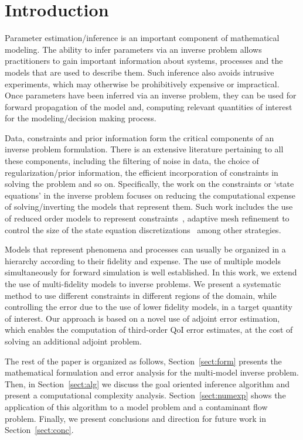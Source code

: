 \section{Introduction}

Parameter estimation/inference is an important component of mathematical modeling. The ability to infer parameters via an inverse problem allows practitioners to gain important information about systems, processes and the models that are used to describe them. Such inference also avoids intrusive experiments, which may otherwise be prohibitively expensive or impractical. Once parameters have been inferred via an inverse problem, they can be used for forward propagation of the model and, computing relevant quantities of interest for the modeling/decision making process.

Data, constraints and prior information form the critical components of an inverse problem formulation. There is an extensive literature pertaining to all these components, including the filtering of noise in data, the choice of regularization/prior information, the efficient incorporation of constraints in solving the problem and so on. Specifically, the work on the constraints or `state equations' in the inverse problem focuses on reducing the computational expense of solving/inverting the models that represent them. Such work includes the use of reduced order models to represent constraints~\cite{}, adaptive mesh refinement to control the size of the state equation discretizations~\cite{} among other strategies.

Models that represent phenomena and processes can usually be organized in a hierarchy according to their fidelity and expense. The use of multiple models simultaneously for forward simulation is well established. In this work, we extend the use of multi-fidelity models to inverse problems. We present a systematic method to use different constraints in different regions of the domain, while controlling the error due to the use of lower fidelity models, in a target quantity of interest. Our approach is based on a novel use of adjoint error estimation, which enables the computation of third-order QoI error estimates, at the cost of solving an additional adjoint problem.

The rest of the paper is organized as follows, Section~\ref{sect:form} presents the mathematical formulation and error analysis for the multi-model inverse problem. Then, in Section~\ref{sect:alg} we discuss the goal oriented inference algorithm and present a computational complexity analysis. Section~\ref{sect:numexp} shows the application of this algorithm to a model problem and a contaminant flow problem. Finally, we present conclusions and direction for future work in Section~\ref{sect:conc}.

